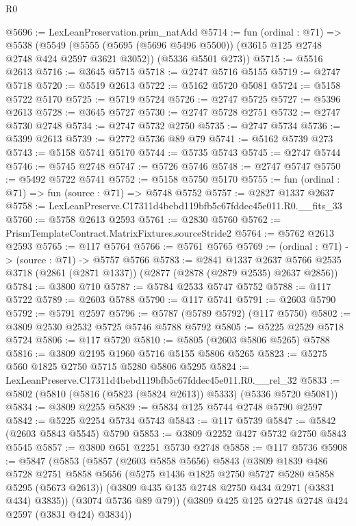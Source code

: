 \begin{lexlean}{R0}
\begin{coremodule}
@5696 := LexLeanPreservation.prim_natAdd
@5714 := fun (ordinal : @71) =>
  @5538
    (@5549
      (@5555 (@5695 (@5696 @5496 @5500)) (@3615 @125 @2748 @2748 @424 @2597 @3621 @3052))
      (@5336 @5501 @273))
@5715 := @5516 @2613
@5716 := @3645 @5715
@5718 := @2747 @5716 @5155
@5719 := @2747 @5718
@5720 := @5519 @2613
@5722 := @5162 @5720 @5081
@5724 := @5158 @5722 @5170
@5725 := @5719 @5724
@5726 := @2747 @5725
@5727 := @5396 @2613
@5728 := @3645 @5727
@5730 := @2747 @5728 @2751
@5732 := @2747 @5730 @2748
@5734 := @2747 @5732 @2750
@5735 := @2747 @5734
@5736 := @5399 @2613
@5739 := @2772 @5736 @89 @79
@5741 := @5162 @5739 @273
@5743 := @5158 @5741 @5170
@5744 := @5735 @5743
@5745 := @2747 @5744
@5746 := @5745 @2748
@5747 := @5726 @5746
@5748 := @2747 @5747
@5750 := @5492 @5722 @5741
@5752 := @5158 @5750 @5170
@5755 := fun (ordinal : @71) => fun (source : @71) => @5748 @5752
@5757 := @2827 @1337 @2637
@5758 := LexLeanPreserve.C17311d4bebd119bfb5c67fddec45e011.R0.__fits_33
@5760 := @5758 @2613 @2593
@5761 := @2830 @5760
@5762 := PrismTemplateContract.MatrixFixtures.sourceStride2
@5764 := @5762 @2613 @2593
@5765 := @117 @5764
@5766 := @5761 @5765
@5769 := (ordinal : @71) -> (source : @71) -> @5757 @5766
@5783 := @2841
    @1337
    @2637
    @5766
    @2535
    @3718
    (@2861 (@2871 @1337))
    (@2877 (@2878 (@2879 @2535) @2637 @2856))
@5784 := @3800 @710
@5787 := @5784 @2533 @5747 @5752
@5788 := @117 @5722
@5789 := @2603 @5788
@5790 := @117 @5741
@5791 := @2603 @5790
@5792 := @5791 @2597
@5796 := @5787 (@5789 @5792) (@117 @5750)
@5802 := @3809 @2530 @2532 @5725 @5746 @5788 @5792
@5805 := @5225 @2529 @5718 @5724
@5806 := @117 @5720
@5810 := @5805 (@2603 @5806 @5265) @5788
@5816 := @3809 @2195 @1960 @5716 @5155 @5806 @5265
@5823 := @5275 @560 @1825 @2750 @5715 @5280 @5806 @5295
@5824 := LexLeanPreserve.C17311d4bebd119bfb5c67fddec45e011.R0.__rel_32
@5833 := @5802 (@5810 (@5816 (@5823 (@5824 @2613)) @5333) (@5336 @5720 @5081))
@5834 := @3809 @2255
@5839 := @5834 @125 @5744 @2748 @5790 @2597
@5842 := @5225 @2254 @5734 @5743
@5843 := @117 @5739
@5847 := @5842 (@2603 @5843 @5545) @5790
@5853 := @3809 @2252 @427 @5732 @2750 @5843 @5545
@5857 := @3800 @651 @2251 @5730 @2748
@5858 := @117 @5736
@5908 := @5847
    (@5853
      (@5857
        (@2603 @5858 @5656)
        @5843
        (@3809
          @1839
          @486
          @5728
          @2751
          @5858
          @5656
          (@5275 @1436 @1825 @2750 @5727 @5280 @5858 @5295 (@5673 @2613))
          (@3809 @435 @135 @2748 @2750 @434 @2971 (@3831 @434) @3835))
        (@3074 @5736 @89 @79))
      (@3809 @425 @125 @2748 @2748 @424 @2597 (@3831 @424) @3834))

\end{coremodule}
\end{lexlean}
